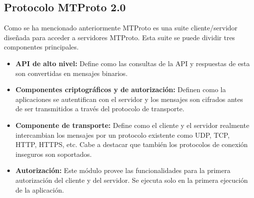 

\subsection{Protocolo MTProto 2.0}
Como se ha mencionado anteriormente MTProto es una suite cliente/servidor diseñada para acceder a servidores MTProto. Esta suite se puede dividir tres componentes principales.

\begin{itemize}
	\item \textbf{API de alto nivel:} Define como las consultas de la API y respuestas de esta son convertidas en mensajes binarios.
	\item \textbf{Componentes criptográficos y de autorización:} Definen como la aplicaciones se autentifican con el servidor y los mensajes son cifrados antes de ser transmitidos a través del protocolo de transporte.	
	\item \textbf{Componente de transporte:} Define como el cliente y el servidor realmente intercambian los mensajes por un protocolo existente como UDP, TCP, HTTP, HTTPS, etc. Cabe a destacar que también los protocolos de conexión inseguros son soportados.
	\item \textbf{Autorización:} Este módulo provee las funcionalidades para la primera autorización del cliente y del servidor. Se ejecuta solo en la primera ejecución de la aplicación.
\end{itemize}
\\
